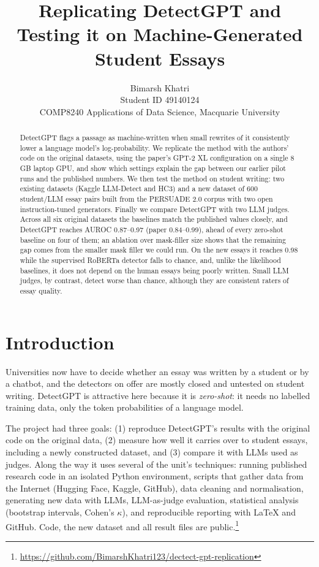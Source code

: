 \documentclass[11pt]{article}
\title{Replicating DetectGPT and Testing it on Machine-Generated Student Essays}
\author{Bimarsh Khatri \\
  Student ID 49140124 \\
  COMP8240 Applications of Data Science, Macquarie University}
\begin{document}
\maketitle

\begin{abstract}
DetectGPT \citep{mitchell2023detectgpt} flags a passage as machine-written when small rewrites of it consistently lower a language model's log-probability. We replicate the method with the authors' code on the original datasets, using the paper's GPT-2 XL configuration on a single 8\,GB laptop GPU, and show which settings explain the gap between our earlier pilot runs and the published numbers. We then test the method on student writing: two existing datasets (Kaggle LLM-Detect and HC3) and a new dataset of 600 student/LLM essay pairs built from the PERSUADE 2.0 corpus with two open instruction-tuned generators. Finally we compare DetectGPT with two LLM judges. Across all six original datasets the baselines match the published values closely, and DetectGPT reaches AUROC 0.87--0.97 (paper 0.84--0.99), ahead of every zero-shot baseline on four of them; an ablation over mask-filler size shows that the remaining gap comes from the smaller mask filler we could run. On the new essays it reaches 0.98 while the supervised RoBERTa detector falls to chance, and, unlike the likelihood baselines, it does not depend on the human essays being poorly written. Small LLM judges, by contrast, detect worse than chance, although they are consistent raters of essay quality.
\end{abstract}

\section{Introduction}
Universities now have to decide whether an essay was written by a student or by a chatbot, and the detectors on offer are mostly closed and untested on student writing. DetectGPT is attractive here because it is \emph{zero-shot}: it needs no labelled training data, only the token probabilities of a language model.

The project had three goals: (1) reproduce DetectGPT's results with the original code on the original data, (2) measure how well it carries over to student essays, including a newly constructed dataset, and (3) compare it with LLMs used as judges. Along the way it uses several of the unit's techniques: running published research code in an isolated Python environment, scripts that gather data from the Internet (Hugging Face, Kaggle, GitHub), data cleaning and normalisation, generating new data with LLMs, LLM-as-judge evaluation, statistical analysis (bootstrap intervals, Cohen's $\kappa$), and reproducible reporting with \LaTeX{} and GitHub. Code, the new dataset and all result files are public.\footnote{\url{https://github.com/BimarshKhatri123/dectect-gpt-replication}}
\end{document}
